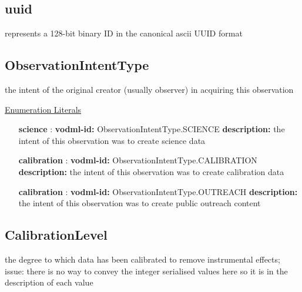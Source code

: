   \subsection{uuid}
  \label{sect:uuid}
  represents a 128-bit binary ID in the canonical ascii UUID format

  \subsection{ObservationIntentType}
  \label{sect:ObservationIntentType}

  the intent of the original creator (usually observer) in acquiring this observation

  \noindent \underline{Enumeration Literals}
  \vspace{-\parsep}
  \small
  \begin{itemize}
  
    \item[\textbf{science}]: \textbf{vodml-id:} ObservationIntentType.SCIENCE \newline
          \textbf{description:} the intent of this observation was to create science data
    \item[\textbf{calibration}]: \textbf{vodml-id:} ObservationIntentType.CALIBRATION \newline
          \textbf{description:} the intent of this observation was to create calibration data
    \item[\textbf{calibration}]: \textbf{vodml-id:} ObservationIntentType.OUTREACH \newline
          \textbf{description:} the intent of this observation was to create public outreach content
  \end{itemize}
  \normalsize


  \subsection{CalibrationLevel}
  \label{sect:CalibrationLevel}

  the degree to which data has been calibrated to remove instrumental effects; issue: there is no way to convey the integer serialised values here so it is in the description of each value

